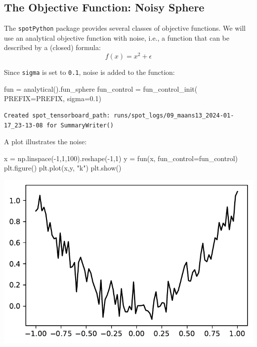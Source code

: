 \documentclass[
  letterpaper,
  DIV=11,
  numbers=noendperiod]{scrreprt}
\newenvironment{Shaded}{\begin{snugshade}}{\end{snugshade}}
\newcommand{\DecValTok}[1]{\textcolor[rgb]{0.68,0.00,0.00}{#1}}
\newcommand{\FloatTok}[1]{\textcolor[rgb]{0.68,0.00,0.00}{#1}}
\newcommand{\NormalTok}[1]{\textcolor[rgb]{0.00,0.23,0.31}{#1}}
\newcommand{\OperatorTok}[1]{\textcolor[rgb]{0.37,0.37,0.37}{#1}}
\newcommand{\StringTok}[1]{\textcolor[rgb]{0.13,0.47,0.30}{#1}}
\begin{document}
\subsection{The Objective Function: Noisy
Sphere}\label{the-objective-function-noisy-sphere-1}

The \texttt{spotPython} package provides several classes of objective
functions. We will use an analytical objective function with noise,
i.e., a function that can be described by a (closed) formula:
\[f(x) = x^2 + \epsilon\]

Since \texttt{sigma} is set to \texttt{0.1}, noise is added to the
function:

\begin{Shaded}
\begin{Highlighting}[]
\NormalTok{fun }\OperatorTok{=}\NormalTok{ analytical().fun\_sphere}
\NormalTok{fun\_control }\OperatorTok{=}\NormalTok{ fun\_control\_init(}
\NormalTok{    PREFIX}\OperatorTok{=}\NormalTok{PREFIX,}
\NormalTok{    sigma}\OperatorTok{=}\FloatTok{0.1}\NormalTok{)}
\end{Highlighting}
\end{Shaded}

\begin{verbatim}
Created spot_tensorboard_path: runs/spot_logs/09_maans13_2024-01-17_23-13-08 for SummaryWriter()
\end{verbatim}

A plot illustrates the noise:

\begin{Shaded}
\begin{Highlighting}[]
\NormalTok{x }\OperatorTok{=}\NormalTok{ np.linspace(}\OperatorTok{{-}}\DecValTok{1}\NormalTok{,}\DecValTok{1}\NormalTok{,}\DecValTok{100}\NormalTok{).reshape(}\OperatorTok{{-}}\DecValTok{1}\NormalTok{,}\DecValTok{1}\NormalTok{)}
\NormalTok{y }\OperatorTok{=}\NormalTok{ fun(x, fun\_control}\OperatorTok{=}\NormalTok{fun\_control)}
\NormalTok{plt.figure()}
\NormalTok{plt.plot(x,y, }\StringTok{"k"}\NormalTok{)}
\NormalTok{plt.show()}
\end{Highlighting}
\end{Shaded}

\includegraphics{014_num_spot_ocba_files/figure-pdf/cell-4-output-1.pdf}
\end{document}

